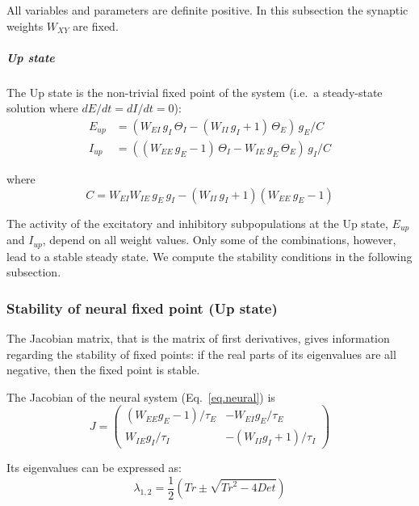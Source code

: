 \documentclass[twocolumn]{article}
\newcommand{\EE}{\mathit{EE}}
\newcommand{\EI}{\mathit{EI}}
\newcommand{\IE}{\mathit{IE}}
\newcommand{\II}{\mathit{II}}
\newcommand{\up}{\mathit{up}}
\newcommand{\De}{\mathit{Det}}
\newcommand{\Tr}{\mathit{Tr}}
\begin{document}
\noindent All variables and parameters are definite positive. In this subsection the synaptic weights $W_{\mathit{XY}}$ are fixed.

\subparagraph{Up state} The Up state is the non-trivial fixed point of the system (i.e.\ a steady-state solution where $dE/dt=dI/dt=0$):
\begin{equation}
\begin{aligned}
E_{\up} & = (W_{\EI} \, g_I \, \Theta_I - (W_{\II} \, g_I + 1) \, \Theta_E) \, g_E / C \\
I_{\up} & = ((W_{\EE} \, g_E - 1) \, \Theta_I - W_{\IE} \, g_E \, \Theta_E) \, g_I / C
\end{aligned}
\label{eq.upstate_orig}
\end{equation}

\noindent where
\begin{equation}
C = W_{\EI} W_{\IE} \, g_E\, g_I - (W_{\II} \, g_I + 1)(W_{\EE} \, g_E - 1)
\label{eq.den}
\end{equation}

The activity of the excitatory and inhibitory subpopulations at the Up state, $E_{\up}$ and $I_{\up}$, depend on all weight values. Only some of the combinations, however, lead to a stable steady state. We compute the stability conditions in the following subsection.


\subsubsection{Stability of neural fixed point (Up state)}

The Jacobian matrix, that is the matrix of first derivatives, gives information regarding the stability of fixed points: if the real parts of its eigenvalues are all negative, then the fixed point is stable.

The Jacobian of the neural system (Eq.\ \ref{eq.neural}) is
\begin{equation}
J = \left(\begin{array}{rr}
(W_{\EE} g_E - 1)/\tau_E & -W_{\EI} g_E/\tau_E \\
W_{\IE} g_I/\tau_I & -(W_{\II} g_I + 1)/\tau_I
\end{array}\right)
\end{equation}

\noindent Its eigenvalues can be expressed as:
\begin{equation}
\lambda_{1,2} = \frac{1}{2}\left(\Tr \pm \sqrt{\Tr^2 - 4\De} \right)
\label{eq.neural.eigvals}
\end{equation}
\end{document}
